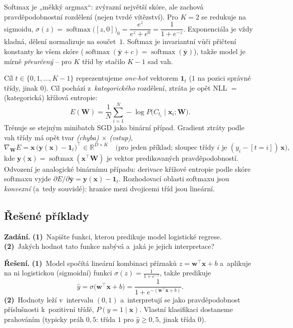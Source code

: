 \begin{intuice}
Softmax je „měkký argmax``: zvýrazní největší skóre, ale zachová pravděpodobnostní rozdělení (nejen tvrdé vítězství). Pro $K=2$ se redukuje na sigmoidu, $\sigma(z)=\operatorname{softmax}\big([z,0]\big)_0=\dfrac{e^{z}}{e^{z}+e^{0}}=\dfrac{1}{1+e^{-z}}$. Exponenciála je vždy kladná, dělení normalizuje na součet~$1$. Softmax je invariantní vůči přičtení konstanty ke všem skóre ($\operatorname{softmax}(\bar{\mathbf{y}}+c)=\operatorname{softmax}(\bar{\mathbf{y}})$), takže model je mírně \emph{přeurčený} -- pro $K$ tříd by stačilo $K-1$ sad vah.
\end{intuice}

\begin{poznamka}
Cíl $t\in\{0,1,\dots,K-1\}$ reprezentujeme \emph{one-hot} vektorem $\mathbf{1}_t$ ($1$ na pozici správné třídy, jinak $0$). Cíl pochází z~\emph{kategorického} rozdělení, ztráta je opět NLL $=$ (kategorická) křížová entropie:
\[ E(\mathbf{W})=\frac1N\sum_{i=1}^N -\log P\big(C_{t_i}\mid\mathbf{x}_i;\mathbf{W}\big). \]
Trénuje se stejným minibatch SGD jako binární případ. Gradient ztráty podle vah třídy má opět tvar \emph{(chyba) $\times$ (vstup)},
\[ \nabla_{\mathbf{W}}E=\mathbf{x}\,\big(\mathbf{y}(\mathbf{x})-\mathbf{1}_t\big)^{\!\top}\in\mathbb{R}^{D\times K}\quad\text{(pro jeden příklad; sloupec třídy $i$ je $(y_i-[t{=}i])\,\mathbf{x}$)}, \]
kde $\mathbf{y}(\mathbf{x})=\operatorname{softmax}(\mathbf{x}^{\!\top}\mathbf{W})$ je vektor predikovaných pravděpodobností. Odvození je analogické binárnímu případu: derivace křížové entropie podle skóre softmaxu vyjde $\partial E/\partial\bar{\mathbf{y}}=\mathbf{y}(\mathbf{x})-\mathbf{1}_t$. Rozhodovací oblasti softmaxu jsou \emph{konvexní} (a~tedy souvislé): hranice mezi dvojicemi tříd jsou lineární.
\end{poznamka}

\subsection{Řešené příklady}

\begin{priklad}
\par
\textbf{Zadání.} \textbf{(1)}~Napište funkci, kterou predikuje model logistické regrese. \textbf{(2)}~Jakých hodnot tato funkce nabývá a~jaká je jejich interpretace?

\smallskip
\textbf{Řešení.} \textbf{(1)}~Model spočítá lineární kombinaci příznaků $z=\mathbf{w}^{\!\top}\mathbf{x}+b$ a~aplikuje na ni logistickou (sigmoidní) funkci $\sigma(z)=\tfrac{1}{1+e^{-z}}$, takže predikuje
\[ \hat y=\sigma\!\big(\mathbf{w}^{\!\top}\mathbf{x}+b\big)=\frac{1}{1+e^{-(\mathbf{w}^{\!\top}\mathbf{x}+b)}}. \]
\textbf{(2)}~Hodnoty leží v~intervalu $(0,1)$ a~interpretují se jako pravděpodobnost příslušnosti k~pozitivní třídě, $P(y{=}1\mid\mathbf{x})$. Vlastní klasifikaci dostaneme prahováním (typicky práh $0{,}5$: třída $1$ pro $\hat y\ge 0{,}5$, jinak třída $0$).
\end{priklad}

